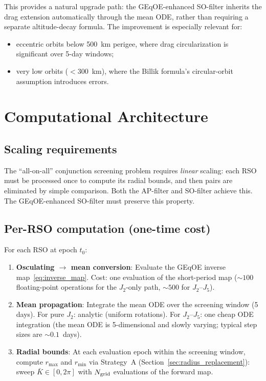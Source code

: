 \documentclass[11pt]{article}
\begin{document}
This provides a natural upgrade path: the GEqOE-enhanced SO-filter inherits
the drag extension automatically through the mean ODE, rather than requiring
a separate altitude-decay formula. The improvement is especially relevant for:
\begin{itemize}
\item eccentric orbits below 500~km perigee, where drag circularization is
significant over 5-day windows;
\item very low orbits ($< 300$~km), where the Billik formula's circular-orbit
assumption introduces errors.
\end{itemize}

\section{Computational Architecture}
\label{sec:computational}

\subsection{Scaling requirements}

The ``all-on-all'' conjunction screening problem requires \emph{linear}
scaling: each RSO must be processed once to compute its radial bounds, and
then pairs are eliminated by simple comparison. Both the AP-filter and
SO-filter achieve this. The GEqOE-enhanced SO-filter must preserve this
property.

\subsection{Per-RSO computation (one-time cost)}

For each RSO at epoch $t_0$:
\begin{enumerate}
\item \textbf{Osculating $\to$ mean conversion}: Evaluate the GEqOE inverse
map~\eqref{eq:inverse_map}. Cost: one evaluation of the short-period map
($\sim\!100$ floating-point operations for the $J_2$-only path,
$\sim\!500$ for $J_2$--$J_5$).
\item \textbf{Mean propagation}: Integrate the mean ODE over the screening
window (5 days). For pure $J_2$: analytic (uniform rotations). For
$J_2$--$J_5$: one cheap ODE integration (the mean ODE is 5-dimensional and
slowly varying; typical step sizes are $\sim\!0.1$~days).
\item \textbf{Radial bounds}: At each evaluation epoch within the screening
window, compute $r_{\max}$ and $r_{\min}$ via Strategy~A
(Section~\ref{sec:radius_replacement}): sweep $\bar K \in [0, 2\pi]$ with
$N_{\rm grid}$ evaluations of the forward map.
\end{enumerate}
\end{document}
